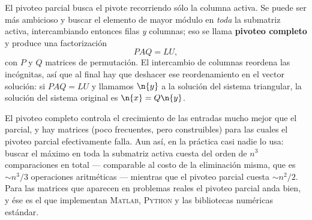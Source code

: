 \begin{remark}\label{obs:pivoteo-completo}
El pivoteo parcial busca el pivote recorriendo sólo la columna activa. Se puede
ser más ambicioso y buscar el elemento de mayor módulo en \emph{toda} la
submatriz activa, intercambiando entonces filas \emph{y} columnas; eso se llama
\textbf{pivoteo completo} y produce una factorización
\[
P A Q = LU ,
\]
con $P$ y $Q$ matrices de permutación. El intercambio de columnas reordena las
incógnitas, así que al final hay que deshacer ese reordenamiento en el vector
solución: si $PAQ=LU$ y llamamos $\n{y}$ a la solución del sistema triangular,
la solución del sistema original es $\n{x}=Q\n{y}$.

El pivoteo completo controla el crecimiento de las entradas mucho mejor que el
parcial, y hay matrices (poco frecuentes, pero construibles) para las cuales el
pivoteo parcial efectivamente falla. Aun así, en la práctica casi nadie lo usa:
buscar el máximo en toda la submatriz activa cuesta del orden de $n^3$
comparaciones en total --- comparable al costo de la eliminación misma, que es
$\sim n^3/3$ operaciones aritméticas --- mientras que el pivoteo parcial cuesta
$\sim n^2/2$. Para las matrices que aparecen en problemas reales el pivoteo
parcial anda bien, y ése es el que implementan \textsc{Matlab},
\textsc{Python} y las bibliotecas numéricas estándar.
\end{remark}

